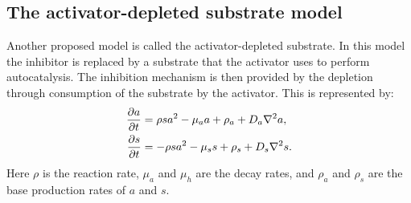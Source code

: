 \subsection{The activator-depleted substrate model}
Another proposed model is called the activator-depleted substrate. In this model the inhibitor is replaced by a substrate that the activator uses to perform autocatalysis. The inhibition mechanism is then provided by the depletion through consumption of the substrate by the activator. This is represented by:
	\begin{equation}
	\begin{aligned} \label{eq:activatorSubstrateRD}
		\frac{\partial a}{\partial t} &= \rho sa^2 - \mu_a a + \rho_a + D_a \nabla^2 a,\\
		\frac{\partial s}{\partial t} &= -\rho sa^2 - \mu_s s + \rho_s + D_s \nabla^2 s.
	\end{aligned}
	\end{equation}
Here $\rho$ is the reaction rate, $\mu_a$ and $\mu_h$ are the decay rates, and $\rho_a$ and $\rho_s$ are the base production rates of $a$ and $s$.

